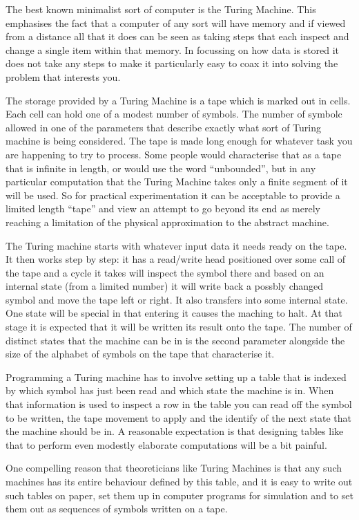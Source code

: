 The best known minimalist sort of computer is the Turing Machine. This
emphasises the fact that a computer of any sort will have memory and if
viewed from a distance all that it does can be seen as taking steps
that each inspect and change a single item within that memory. In focussing
on how data is stored it does not take any steps to make it particularly
easy to coax it into solving the problem that interests you.

The storage provided by a Turing Machine is a tape which is marked out in
cells. Each cell can hold one of a modest number of symbols. The number
of symbolc allowed in one of the parameters that describe exactly what
sort of Turing machine is being considered. The tape is made long enough
for whatever task you are happening to try to process. Some people would
characterise that as a tape that is infinite in length, or would use
the word ``unbounded'', but in any particular computation that the Turing
Machine takes only a finite segment of it will be used. So for practical
experimentation it can be acceptable to provide a limited length ``tape''
and view an attempt to go beyond its end as merely reaching a limitation of
the physical approximation to the abstract machine.

The Turing machine starts with whatever input data it needs ready on the
tape. It then works step by step: it has a read/write head positioned
over some call of the tape and a cycle it takes will inspect the
symbol there and based on an internal state (from a limited number) it
will write back a possbly changed symbol and move the tape left or
right. It also transfers into some internal state. One state will be
special in that entering it causes the maching to halt. At that stage it
is expected that it will be written its result onto the tape. The number of
distinct states that the machine can be in is the second parameter alongside
the size of the alphabet of symbols on the tape that characterise it.

Programming a Turing machine has to involve setting up a table that
is indexed by which symbol has just been read and which state the machine
is in. When that information is used to inspect a row in the table
you can read off the symbol to be written, the tape movement to apply and
the identify of the next state that the machine should be in.  A reasonable
expectation is that designing tables like that to perform even modestly
elaborate computations will be a bit painful.

One compelling reason that theoreticians like Turing Machines is that
any such machines has its entire behaviour defined by this table, and it
is easy to write out such tables on paper, set them up in computer
programs for simulation and to set them out as sequences of symbols
written on a tape.

